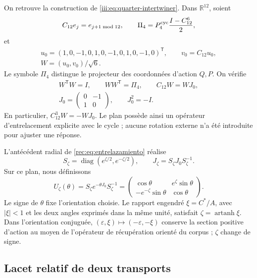On retrouve la construction de \eqref{iii:eq:quarter-intertwiner}. Dans \(\mathbb R^{12}\),
soient
\[
 C_{12}e_j=e_{j+1\bmod12},\qquad
 \Pi_4=P_4^{\rm cyc}\frac{I-C_{12}^6}{2},
\]
et
\begin{equation}
 \begin{gathered}
 u_0=(1,0,-1,0,1,0,-1,0,1,0,-1,0)^{\mathsf T},\qquad
 v_0=C_{12}u_0,\\
 W=(u_0,v_0)/\sqrt6.
 \end{gathered}
 \label{md:comp:isometria-ciclica}
\end{equation}
Le symbole \(\Pi_4\) distingue le projecteur des coordonnées
d’action \(Q,P\). On vérifie
\begin{equation}
 \begin{gathered}
 W^{\mathsf T}W=I,\qquad WW^{\mathsf T}=\Pi_4,\qquad
 C_{12}W=WJ_0,\\
 J_0=\begin{pmatrix}0&-1\\1&0\end{pmatrix},\qquad J_0^2=-I.
 \end{gathered}
 \label{md:comp:entrelazador-ciclico}
\end{equation}
En particulier, \(C_{12}^3W=-WJ_0\). Le plan possède ainsi un opérateur d’entrelacement
explicite avec le cycle ; aucune rotation externe n’a été introduite pour
ajuster une réponse.

L’antécédent radial de \eqref{rec:eq:entrelazamiento} réalise
\[
 S_\zeta=\operatorname{diag}(e^{\zeta/2},e^{-\zeta/2}),
 \qquad J_\zeta=S_\zeta J_0S_\zeta^{-1}.
\]
Sur ce plan, nous définissons
\begin{equation}
 U_\zeta(\theta)=S_\zeta e^{-\theta J_0}S_\zeta^{-1}
 =\begin{pmatrix}
 \cos\theta&e^\zeta\sin\theta\\
 -e^{-\zeta}\sin\theta&\cos\theta
 \end{pmatrix}.
 \label{md:comp:transporte-plano}
\end{equation}
Le signe de \(\theta\) fixe l’orientation choisie. Le rapport engendré
\(\xi=C^*/A\), avec \(|\xi|<1\) et les deux angles exprimés dans la même
unité, satisfait \(\zeta=\operatorname{artanh}\xi\).
Dans l’orientation conjuguée,
\((\varepsilon,\xi)\mapsto(-\varepsilon,-\xi)\) conserve la section
positive d’action au moyen de l’opérateur de récupération orienté du corpus ;
\(\zeta\) change de signe.

\subsection{Lacet relatif de deux transports}
\label{md:comp:lazo}


